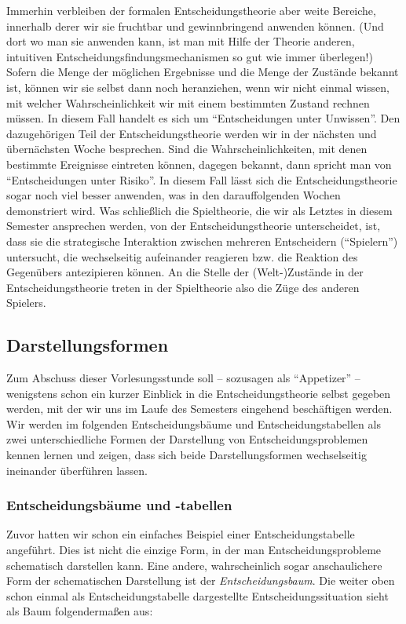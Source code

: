 Immerhin verbleiben der formalen Entscheidungstheorie aber weite
Bereiche, innerhalb derer wir sie fruchtbar und gewinnbringend
anwenden können. (Und dort wo man sie anwenden kann, ist man mit Hilfe
der Theorie anderen, intuitiven Entscheidungsfindungsmechanismen so
gut wie immer überlegen!) Sofern die Menge der möglichen Ergebnisse
und die Menge der Zustände bekannt ist, können wir sie selbst dann
noch heranziehen, wenn wir nicht einmal wissen, mit welcher
Wahrscheinlichkeit wir mit einem bestimmten Zustand rechnen müssen. In
diesem Fall handelt es sich um "`Entscheidungen unter Unwissen"'. Den
dazugehörigen Teil der Entscheidungstheorie werden wir in der nächsten
und übernächsten Woche besprechen. Sind die Wahrscheinlichkeiten, mit
denen bestimmte Ereignisse eintreten können, dagegen bekannt, dann
spricht man von "`Entscheidungen unter Risiko"'. In diesem Fall lässt
sich die Entscheidungstheorie sogar noch viel besser anwenden, was in
den darauf\/folgenden Wochen demonstriert wird. Was schließlich die
Spieltheorie, die wir als Letztes in diesem Semester ansprechen
werden, von der Entscheidungstheorie unterscheidet, ist, dass sie die
strategische Interaktion zwischen mehreren Entscheidern ("`Spielern"')
untersucht, die wechselseitig aufeinander reagieren bzw. die Reaktion
des Gegenübers antezipieren können. An die Stelle der (Welt-)Zustände
in der Entscheidungstheorie treten in der Spieltheorie also die Züge
des anderen Spielers.

\subsection{Darstellungsformen}

Zum Abschuss dieser Vorlesungsstunde soll -- sozusagen als
"`Appetizer"' -- wenigstens schon ein kurzer Einblick in die
Entscheidungstheorie selbst gegeben werden, mit der wir uns im Laufe
des Semesters eingehend beschäftigen werden. Wir werden im folgenden
Entscheidungsbäume und Entscheidungstabellen als zwei unterschiedliche
Formen der Darstellung von Entscheidungsproblemen kennen lernen und
zeigen, dass sich beide Darstellungsformen wechselseitig ineinander
überführen lassen.

\subsubsection{Entscheidungsbäume und -tabellen}

Zuvor hatten wir schon ein einfaches Beispiel einer
Entscheidungstabelle angeführt. Dies ist nicht die einzige Form, in
der man Entscheidungsprobleme schematisch darstellen kann. Eine
andere, wahrscheinlich sogar anschaulichere Form der schematischen
Darstellung ist der {\em Entscheidungsbaum}. Die weiter oben schon
einmal als Entscheidungstabelle dargestellte Entscheidungssituation
sieht als Baum folgendermaßen aus:


